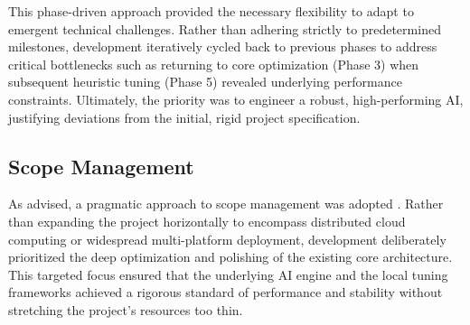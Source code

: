 This phase-driven approach provided the necessary flexibility to adapt to emergent technical challenges. Rather than adhering strictly to predetermined milestones, development iteratively cycled back to previous phases to address critical bottlenecks such as returning to core optimization (Phase 3) when subsequent heuristic tuning (Phase 5) revealed underlying performance constraints. Ultimately, the priority was to engineer a robust, high-performing AI, justifying deviations from the initial, rigid project specification.

\subsection{Scope Management}
As advised, a pragmatic approach to scope management was adopted \cite{assessor}. Rather than expanding the project horizontally to encompass distributed cloud computing or widespread multi-platform deployment, development deliberately prioritized the deep optimization and polishing of the existing core architecture. This targeted focus ensured that the underlying AI engine and the local tuning frameworks achieved a rigorous standard of performance and stability without stretching the project's resources too thin.